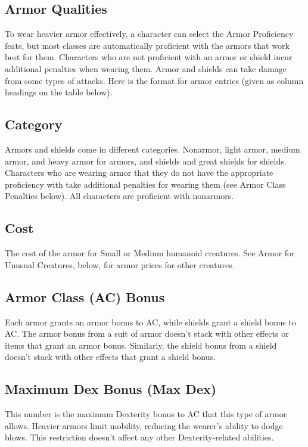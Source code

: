 \afterpage{}

\subsection{Armor Qualities}
To wear heavier armor effectively, a character can select the Armor Proficiency feats, but most classes are automatically proficient with the armors that work best for them. Characters who are not proficient with an armor or shield incur additional penalties when wearing them. Armor and shields can take damage from some types of attacks. Here is the format for armor entries (given as column headings on the table below).

\subsection{Category}
Armors and shields come in different categories. Nonarmor, light armor, medium armor, and heavy armor for armors, and shields and great shields for shields. Characters who are wearing armor that they do not have the appropriate proficiency with take additional penalties for wearing them (see Armor Class Penalties below). All characters are proficient with nonarmors.

\subsection{Cost}
The cost of the armor for Small or Medium humanoid creatures. See Armor for Unusual Creatures, below, for armor prices for other creatures.

\subsection{Armor Class (AC) Bonus}
Each armor grants an armor bonus to AC, while shields grant a shield bonus to AC. The armor bonus from a suit of armor doesn't stack with other effects or items that grant an armor bonus. Similarly, the shield bonus from a shield doesn't stack with other effects that grant a shield bonus.

\subsection{Maximum Dex Bonus (Max Dex)}
This number is the maximum Dexterity bonus to AC that this type of armor allows. Heavier armors limit mobility, reducing the wearer's ability to dodge blows. This restriction doesn't affect any other Dexterity-related abilities.

